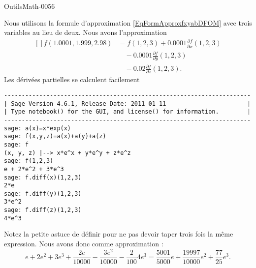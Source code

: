 
\begin{corrige}{OutilsMath-0056}

    Nous utilisons la formule d'approximation \eqref{EqFormApproxfxyabDFOM} avec trois variables au lieu de deux. Nous avons l'approximation
    \begin{equation}
        \begin{aligned}[]
            f(1.0001,1.999,2.98)&=f(1,2,3)+0.0001\frac{ \partial f }{ \partial x }(1,2,3)\\
            &\quad -0.0001\frac{ \partial f }{ \partial y }(1,2,3)\\
            &\quad -0.02\frac{ \partial f }{ \partial z }(1,2,3).
        \end{aligned}
    \end{equation}
    Les dérivées partielles se calculent facilement
    \begin{verbatim}
----------------------------------------------------------------------
| Sage Version 4.6.1, Release Date: 2011-01-11                       |
| Type notebook() for the GUI, and license() for information.        |
----------------------------------------------------------------------
sage: a(x)=x*exp(x)
sage: f(x,y,z)=a(x)+a(y)+a(z)
sage: f
(x, y, z) |--> x*e^x + y*e^y + z*e^z
sage: f(1,2,3)
e + 2*e^2 + 3*e^3
sage: f.diff(x)(1,2,3)
2*e
sage: f.diff(y)(1,2,3)
3*e^2
sage: f.diff(z)(1,2,3)
4*e^3
    \end{verbatim}
    Notez la petite astuce de définir  pour ne pas devoir taper trois fois la même expression. Nous avons donc comme approximation :
    \begin{equation}
        e+2e^2+3e^3+\frac{ 2e }{ 10000 }-\frac{ 3e^2 }{ 10000 }-\frac{ 2 }{ 100 }4e^3=\frac{ 5001 }{ 5000 }e+\frac{ 19997 }{ 10000 }e^2+\frac{ 77 }{ 25 }e^3.
    \end{equation}

\end{corrige}
